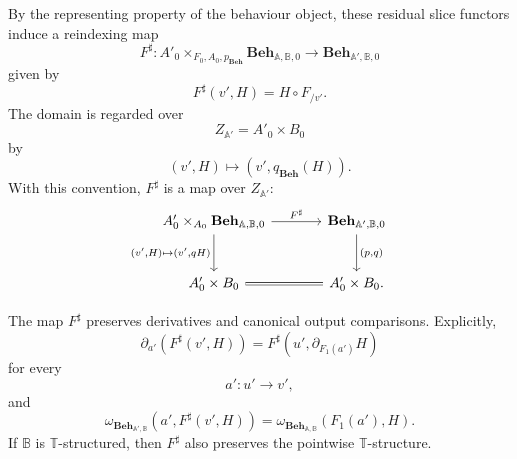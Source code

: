 By the representing property of the behaviour object, these residual slice
functors induce a reindexing map
\[
    F^\sharp:
    A'_0\times_{F_0,A_0,p_{\mathbf{Beh}}}
    \mathbf{Beh}_{\mathbb A,\mathbb B,0}
    \to
    \mathbf{Beh}_{\mathbb A',\mathbb B,0}
\]
given by
\[
    F^\sharp(v',H)=H\circ F_{/v'}.
\]
The domain is regarded over
\[
    Z_{\mathbb A'}=A'_0\times B_0
\]
by
\[
    (v',H)\longmapsto (v',q_{\mathbf{Beh}}(H)).
\]
With this convention, \(F^\sharp\) is a map over \(Z_{\mathbb A'}\):
\[
\begin{tikzcd}[column sep=large, row sep=large]
    A'_0\times_{A_0}\mathbf{Beh}_{\mathbb A,\mathbb B,0}
        \arrow[r, "F^\sharp"]
        \arrow[d, "{(v',H)\mapsto(v',qH)}"']
    &
    \mathbf{Beh}_{\mathbb A',\mathbb B,0}
        \arrow[d, "{(p,q)}"]
    \\
    A'_0\times B_0
        \arrow[r, equal]
    &
    A'_0\times B_0 .
\end{tikzcd}
\]

\begin{lemma}
\label{lem:global-reindexing-preserves-structure}
    The map \(F^\sharp\) preserves derivatives and canonical output
    comparisons. Explicitly,
    \[
        \partial_{a'}(F^\sharp(v',H))
        =
        F^\sharp(u',\partial_{F_1(a')}H)
    \]
    for every
    \[
        a':u'\to v',
    \]
    and
    \[
        \omega_{\mathbf{Beh}_{\mathbb A',\mathbb B}}
        (a',F^\sharp(v',H))
        =
        \omega_{\mathbf{Beh}_{\mathbb A,\mathbb B}}
        (F_1(a'),H).
    \]
    If \(\mathbb B\) is \(\mathbb T\)-structured, then \(F^\sharp\) also
    preserves the pointwise \(\mathbb T\)-structure.
\end{lemma}

